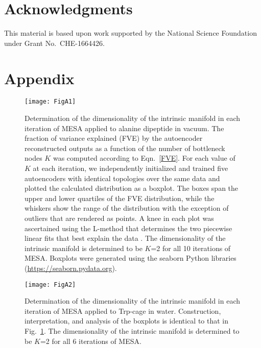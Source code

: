 \documentclass[12pt]{article}
\newcommand*{\blauw}[1]{#1}
\begin{document}
\section*{\sffamily \Large Acknowledgments}

This material is based upon work supported by the National Science Foundation under Grant No.~CHE-1664426.






\clearpage
\newpage

\section*{\sffamily \Large Appendix}

\setcounter{figure}{0}
\renewcommand{\thefigure}{A\arabic{figure}}

\begin{figure}[ht!]
\begin{center}
\texttt{[image: FigA1]} 
\caption{Determination of the dimensionality of the intrinsic manifold in each iteration of MESA applied to alanine dipeptide in vacuum. The fraction of variance explained (FVE) by the autoencoder reconstructed outputs as a function of the number of bottleneck nodes $K$ was computed according to \blauw{Eqn.~\ref{FVE}}. For each value of $K$ at each iteration, we independently initialized and trained five autoencoders with identical topologies over the same data and plotted the calculated distribution as a boxplot. The boxes span the upper and lower quartiles of the FVE distribution, while the whiskers show the range of the distribution with the exception of outliers that are rendered as points. A knee in each plot was ascertained using the L-method that determines the two piecewise linear fits that best explain the data \cite{salvador2004determining}. The dimensionality of the intrinsic manifold is determined to be $K$=2 for all 10 iterations of MESA. Boxplots were generated using the seaborn Python libraries (\url{https://seaborn.pydata.org}).}
\label{L_dim_Ala}
\end{center}
\end{figure}


\begin{figure}[ht!]
\begin{center}
\texttt{[image: FigA2]} 
\caption{Determination of the dimensionality of the intrinsic manifold in each iteration of MESA applied to Trp-cage in water. Construction, interpretation, and analysis of the boxplots is identical to that in \blauw{Fig.~\ref{L_dim_Ala}}. The dimensionality of the intrinsic manifold is determined to be $K$=2 for all 6 iterations of MESA.}
\label{L_dim_Trp_cage}
\end{center}
\end{figure}
\end{document}
